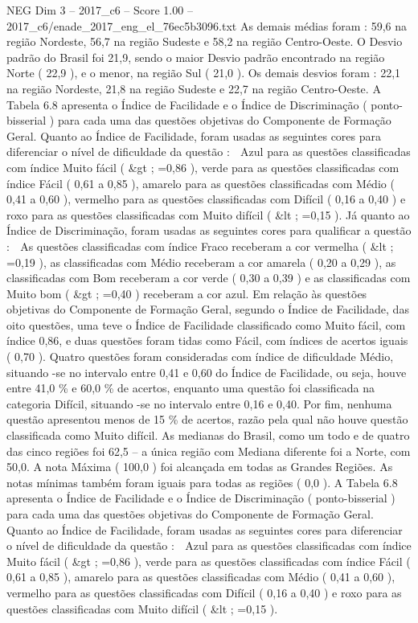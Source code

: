 \begin{textsample}{NEG Dim 3 – 2017\_c6 – Score 1.00 – 2017\_c6/enade\_2017\_eng\_el\_76ec5b3096.txt}
As demais médias foram : 59,6 na região Nordeste, 56,7 na região Sudeste e 58,2 na região Centro-Oeste.
O Desvio padrão do Brasil foi 21,9, sendo o maior Desvio padrão encontrado na região Norte ( 22,9 ), e o menor, na região Sul ( 21,0 ).
Os demais desvios foram : 22,1 na região Nordeste, 21,8 na região Sudeste e 22,7 na região Centro-Oeste.
A Tabela 6.8 apresenta o Índice de Facilidade e o Índice de Discriminação ( ponto-bisserial ) para cada uma das questões objetivas do Componente de Formação Geral.
Quanto ao Índice de Facilidade, foram usadas as seguintes cores para diferenciar o nível de dificuldade da questão :  Azul para as questões classificadas com índice Muito fácil ( \&gt ; =0,86 ), verde para as questões classificadas com índice Fácil ( 0,61 a 0,85 ), amarelo para as questões classificadas com Médio ( 0,41 a 0,60 ), vermelho para as questões classificadas com Difícil ( 0,16 a 0,40 ) e roxo para as questões classificadas com Muito difícil ( \&lt ; =0,15 ).
Já quanto ao Índice de Discriminação, foram usadas as seguintes cores para qualificar a questão :  As questões classificadas com índice Fraco receberam a cor vermelha ( \&lt ; =0,19 ), as classificadas com Médio receberam a cor amarela ( 0,20 a 0,29 ), as classificadas com Bom receberam a cor verde ( 0,30 a 0,39 ) e as classificadas com Muito bom ( \&gt ; =0,40 ) receberam a cor azul.
Em relação às questões objetivas do Componente de Formação Geral, segundo o Índice de Facilidade, das oito questões, uma teve o Índice de Facilidade classificado como Muito fácil, com índice 0,86, e duas questões foram tidas como Fácil, com índices de acertos iguais ( 0,70 ).
Quatro questões foram consideradas com índice de dificuldade Médio, situando -se no intervalo entre 0,41 e 0,60 do Índice de Facilidade, ou seja, houve entre 41,0 \% e 60,0 \% de acertos, enquanto uma questão foi classificada na categoria Difícil, situando -se no intervalo entre 0,16 e 0,40.
Por fim, nenhuma questão apresentou menos de 15 \% de acertos, razão pela qual não houve questão classificada como Muito difícil.
As medianas do Brasil, como um todo e de quatro das cinco regiões foi 62,5 – a única região com Mediana diferente foi a Norte, com 50,0.
A nota Máxima ( 100,0 ) foi alcançada em todas as Grandes Regiões.
As notas mínimas também foram iguais para todas as regiões ( 0,0 ).
A Tabela 6.8 apresenta o Índice de Facilidade e o Índice de Discriminação ( ponto-bisserial ) para cada uma das questões objetivas do Componente de Formação Geral.
Quanto ao Índice de Facilidade, foram usadas as seguintes cores para diferenciar o nível de dificuldade da questão :  Azul para as questões classificadas com índice Muito fácil ( \&gt ; =0,86 ), verde para as questões classificadas com índice Fácil ( 0,61 a 0,85 ), amarelo para as questões classificadas com Médio ( 0,41 a 0,60 ), vermelho para as questões classificadas com Difícil ( 0,16 a 0,40 ) e roxo para as questões classificadas com Muito difícil ( \&lt ; =0,15 ).

\end{textsample}
